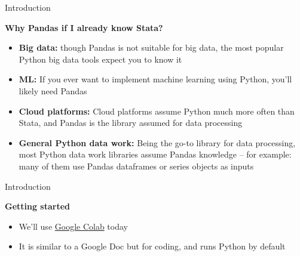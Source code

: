 \documentclass[aspectratio=169]{beamer}
\begin{document}
\begin{frame}{Introduction}

	\textbf{Why Pandas if I already know Stata?}

	\begin{itemize}
		\item \textbf{Big data:} though Pandas is not suitable for big data,  the most popular Python big data tools expect you to know it
		\item \textbf{ML:} If you ever want to implement machine learning using Python, you'll likely need Pandas
		\item \textbf{Cloud platforms:} Cloud platforms assume Python much more often than Stata, and Pandas is the library assumed for data processing
		\item \textbf{General Python data work:} Being the go-to library for data processing, most Python data work libraries assume Pandas knowledge -- for example: many of them use Pandas dataframes or series objects as inputs
	\end{itemize}

\end{frame}

\begin{frame}{Introduction}

	\textbf{Getting started}

	\begin{itemize}
		\item We'll use \href{http://colab.research.google.com}{Google Colab} today
		\item It is similar to a Google Doc but for coding, and runs Python by default
	\end{itemize}

\end{frame}
\end{document}
